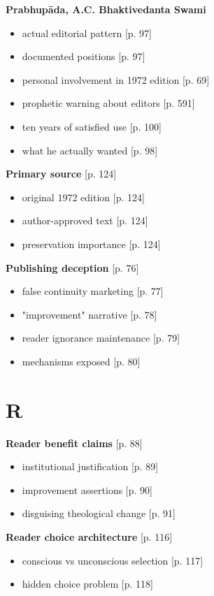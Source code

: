 \documentclass[11pt,twoside]{book}
\begin{document}
\textbf{\textbf{Prabhupāda, A.C. Bhaktivedanta Swami}}
\begin{itemize}
\item actual editorial pattern [p. 97]
\item documented positions [p. 97]
\item personal involvement in 1972 edition [p. 69]
\item prophetic warning about editors [p. 591]
\item ten years of satisfied use [p. 100]
\item what he actually wanted [p. 98]
\end{itemize}

\textbf{\textbf{Primary source}} {[}p. 124]
\begin{itemize}
\item original 1972 edition [p. 124]
\item author-approved text [p. 124]
\item preservation importance [p. 124]
\end{itemize}

\textbf{\textbf{Publishing deception}} {[}p. 76]
\begin{itemize}
\item false continuity marketing [p. 77]
\item "improvement" narrative [p. 78]
\item reader ignorance maintenance [p. 79]
\item mechanisms exposed [p. 80]
\end{itemize}
\section*{R}
\label{sec:orga85de4e}

\textbf{\textbf{Reader benefit claims}} {[}p. 88]
\begin{itemize}
\item institutional justification [p. 89]
\item improvement assertions [p. 90]
\item disguising theological change [p. 91]
\end{itemize}

\textbf{\textbf{Reader choice architecture}} {[}p. 116]
\begin{itemize}
\item conscious vs unconscious selection [p. 117]
\item hidden choice problem [p. 118]
\end{itemize}
\end{document}
